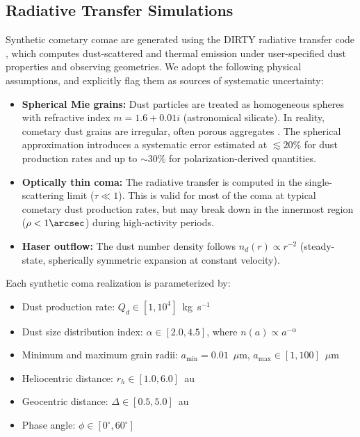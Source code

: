 \documentclass[preprint2]{aastex631}
\begin{document}
\subsection{Radiative Transfer Simulations}

Synthetic cometary comae are generated using the DIRTY radiative transfer code \citep{gordon01}, which computes dust-scattered and thermal emission under user-specified dust properties and observing geometries. We adopt the following physical assumptions, and explicitly flag them as sources of systematic uncertainty:

\begin{itemize}
    \item \textbf{Spherical Mie grains:} Dust particles are treated as homogeneous spheres with refractive index $m = 1.6 + 0.01i$ (astronomical silicate). In reality, cometary dust grains are irregular, often porous aggregates \citep{kolokolova04}. The spherical approximation introduces a systematic error estimated at $\lesssim 20\%$ for dust production rates and up to $\sim 30\%$ for polarization-derived quantities.
    \item \textbf{Optically thin coma:} The radiative transfer is computed in the single-scattering limit ($\tau \ll 1$). This is valid for most of the coma at typical cometary dust production rates, but may break down in the innermost region ($\rho < 1\arcsec$) during high-activity periods.
    \item \textbf{Haser outflow:} The dust number density follows $n_d(r) \propto r^{-2}$ (steady-state, spherically symmetric expansion at constant velocity).
\end{itemize}

Each synthetic coma realization is parameterized by:
\begin{itemize}
    \item Dust production rate: $Q_d \in [1, 10^4]$~kg~s$^{-1}$
    \item Dust size distribution index: $\alpha \in [2.0, 4.5]$, where $n(a) \propto a^{-\alpha}$
    \item Minimum and maximum grain radii: $a_{\min} = 0.01$~$\mu$m, $a_{\max} \in [1, 100]$~$\mu$m
    \item Heliocentric distance: $r_h \in [1.0, 6.0]$~au
    \item Geocentric distance: $\Delta \in [0.5, 5.0]$~au
    \item Phase angle: $\phi \in [0^\circ, 60^\circ]$
\end{itemize}
\end{document}
